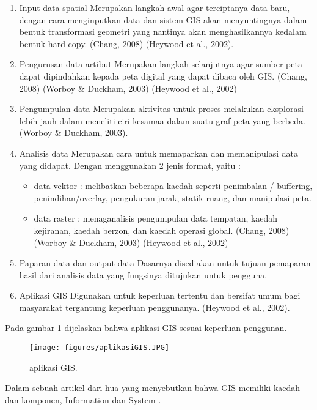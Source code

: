 \begin{enumerate}
\item Input data spatial
Merupakan langkah awal agar terciptanya data baru, dengan cara menginputkan data dan sistem GIS akan menyuntingnya dalam bentuk transformasi geometri yang nantinya akan menghasilkannya kedalam bentuk hard copy. (Chang, 2008) 
(Heywood et al., 2002).

\item Pengurusan data artibut
Merupakan langkah selanjutnya agar sumber peta dapat dipindahkan kepada peta digital yang dapat dibaca oleh GIS.
(Chang, 2008) (Worboy \& Duckham, 2003) (Heywood et al., 2002)

\item Pengumpulan data
Merupakan aktivitas untuk proses melakukan eksplorasi lebih jauh dalam meneliti ciri kesamaa dalam suatu graf peta yang berbeda. (Worboy \& Duckham, 2003).

\item Analisis data
Merupakan cara untuk memaparkan dan memanipulasi data yang didapat. Dengan menggunakan 2 jenis format, yaitu :
\begin{itemize}
\item data vektor : melibatkan beberapa kaedah seperti penimbalan / buffering, penindihan/overlay, pengukuran jarak, statik ruang, dan manipulasi peta.
\item data raster : menaganalisis pengumpulan data tempatan, kaedah kejiranan, kaedah berzon, dan kaedah operasi global.
(Chang, 2008) (Worboy \& Duckham, 2003) (Heywood et al., 2002)
\end{itemize}

\item Paparan data dan output data
Dasarnya disediakan untuk tujuan pemaparan hasil dari analisis data yang fungsinya ditujukan untuk pengguna.

\item Aplikasi GIS
Digunakan untuk keperluan tertentu dan bersifat umum bagi masyarakat tergantung keperluan penggunanya. 
(Heywood et al., 2002).
\end{enumerate}

Pada gambar \ref{aplikasiGIS} dijelaskan bahwa aplikasi GIS sesuai keperluan penggunan.
\begin{figure}[ht]
	\centerline{\texttt{[image: figures/aplikasiGIS.JPG]}}
	\caption{aplikasi GIS.}
	\label{aplikasiGIS}
	\end{figure}
Dalam sebuah artikel dari hua yang menyebutkan bahwa  GIS memiliki kaedah dan komponen, Information dan System \cite{hua2017sistem}.

